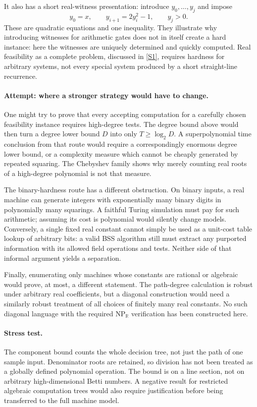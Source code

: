 \documentclass[11pt,a4paper]{article}
\newcommand{\R}{\mathbb{R}}
\newcommand{\sref}[2]{\hyperlink{source:#1:#2}{[S#2]}}
\numberwithin{equation}{section}
\begin{document}
It also has a short real-witness presentation: introduce $y_0,\ldots,y_j$
and impose
\[
 y_0=x,\qquad y_{i+1}=2y_i^2-1,\qquad y_j>0.
\]
These are quadratic equations and one inequality. They illustrate why
introducing witnesses for arithmetic gates does not in itself create a
hard instance: here the witnesses are uniquely determined and quickly
computed. Real feasibility as a complete problem, discussed in
\sref{statement}{1}, requires hardness for arbitrary systems, not every special
system produced by a short straight-line recurrence.

\paragraph{Attempt: where a stronger strategy would have to change.}
One might try to prove that every accepting computation for a carefully
chosen feasibility instance requires high-degree tests. The degree bound
above would then turn a degree lower bound $D$ into only $T\ge\log_2D$.
A superpolynomial time conclusion from that route would require a
correspondingly enormous degree lower bound, or a complexity measure which
cannot be cheaply generated by repeated squaring. The Chebyshev family
shows why merely counting real roots of a high-degree polynomial is not
that measure.

The binary-hardness route has a different obstruction. On binary inputs,
a real machine can generate integers with exponentially many binary digits
in polynomially many squarings. A faithful Turing simulation must pay for
such arithmetic; assuming its cost is polynomial would silently change
models. Conversely, a single fixed real constant cannot simply be used as
a unit-cost table lookup of arbitrary bits: a valid BSS algorithm still
must extract any purported information with its allowed field operations
and tests. Neither side of that informal argument yields a separation.

Finally, enumerating only machines whose constants are rational or algebraic
would prove, at most, a different statement. The path-degree calculation
is robust under arbitrary real coefficients, but a diagonal construction
would need a similarly robust treatment of all choices of finitely many
real constants. No such diagonal language with the required
$\mathrm{NP}_{\R}$ verification has been constructed here.

\paragraph{Stress test.}
The component bound counts the whole decision tree, not just the path of
one sample input. Denominator roots are retained, so division has not been
treated as a globally defined polynomial operation. The bound is on a line
section, not on arbitrary high-dimensional Betti numbers. A negative result
for restricted algebraic computation trees would also require justification
before being transferred to the full machine model.
\end{document}
